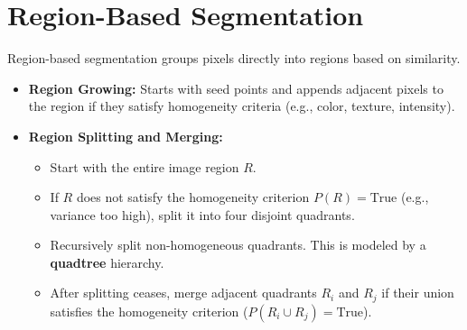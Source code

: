 \documentclass[12pt,a4paper]{article}
\begin{document}
\section{Region-Based Segmentation}

Region-based segmentation groups pixels directly into regions based on similarity.

\begin{itemize}[leftmargin=*, itemsep=3.5pt]
  \item \textbf{Region Growing:} Starts with seed points and appends adjacent pixels to the region if they satisfy homogeneity criteria (e.g., color, texture, intensity).
  \item \textbf{Region Splitting and Merging:}
    \begin{itemize}[leftmargin=1em, itemsep=1.5pt]
      \item Start with the entire image region $R$.
      \item If $R$ does not satisfy the homogeneity criterion $P(R) = \text{True}$ (e.g., variance too high), split it into four disjoint quadrants.
      \item Recursively split non-homogeneous quadrants. This is modeled by a \textbf{quadtree} hierarchy.
      \item After splitting ceases, merge adjacent quadrants $R_i$ and $R_j$ if their union satisfies the homogeneity criterion ($P(R_i \cup R_j) = \text{True}$).
    \end{itemize}
\end{itemize}
\end{document}
